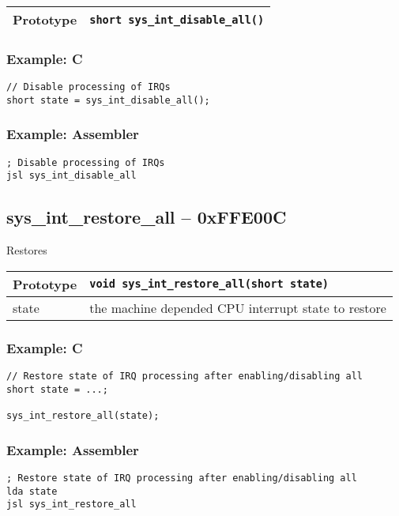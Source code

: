 \bigskip

\begin{tabular}{|l||l|} \hline
Prototype & \lstinline!short sys_int_disable_all()! \\ \hline
\end{tabular}

\subsubsection*{Example: C}
\begin{lstlisting}
// Disable processing of IRQs
short state = sys_int_disable_all();
\end{lstlisting}

\subsubsection*{Example: Assembler}
\begin{verbatim}
; Disable processing of IRQs
jsl sys_int_disable_all
\end{verbatim}


\subsection*{sys\_int\_restore\_all -- 0xFFE00C}
Restores 

\bigskip

\begin{tabular}{|l||l|} \hline
Prototype & \lstinline!void sys_int_restore_all(short state)! \\ \hline
state & the machine depended CPU interrupt state to restore
\end{tabular}

\subsubsection*{Example: C}
\begin{lstlisting}
// Restore state of IRQ processing after enabling/disabling all
short state = ...;

sys_int_restore_all(state);
\end{lstlisting}

\subsubsection*{Example: Assembler}
\begin{verbatim}
; Restore state of IRQ processing after enabling/disabling all
lda state
jsl sys_int_restore_all
\end{verbatim}

